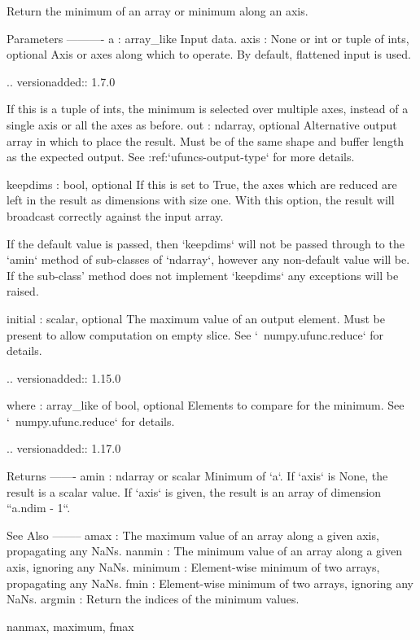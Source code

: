 \begin{DoxyVerb}Return the minimum of an array or minimum along an axis.

Parameters
----------
a : array_like
    Input data.
axis : None or int or tuple of ints, optional
    Axis or axes along which to operate.  By default, flattened input is
    used.

    .. versionadded:: 1.7.0

    If this is a tuple of ints, the minimum is selected over multiple axes,
    instead of a single axis or all the axes as before.
out : ndarray, optional
    Alternative output array in which to place the result.  Must
    be of the same shape and buffer length as the expected output.
    See :ref:`ufuncs-output-type` for more details.

keepdims : bool, optional
    If this is set to True, the axes which are reduced are left
    in the result as dimensions with size one. With this option,
    the result will broadcast correctly against the input array.

    If the default value is passed, then `keepdims` will not be
    passed through to the `amin` method of sub-classes of
    `ndarray`, however any non-default value will be.  If the
    sub-class' method does not implement `keepdims` any
    exceptions will be raised.

initial : scalar, optional
    The maximum value of an output element. Must be present to allow
    computation on empty slice. See `~numpy.ufunc.reduce` for details.

    .. versionadded:: 1.15.0

where : array_like of bool, optional
    Elements to compare for the minimum. See `~numpy.ufunc.reduce`
    for details.

    .. versionadded:: 1.17.0

Returns
-------
amin : ndarray or scalar
    Minimum of `a`. If `axis` is None, the result is a scalar value.
    If `axis` is given, the result is an array of dimension
    ``a.ndim - 1``.

See Also
--------
amax :
    The maximum value of an array along a given axis, propagating any NaNs.
nanmin :
    The minimum value of an array along a given axis, ignoring any NaNs.
minimum :
    Element-wise minimum of two arrays, propagating any NaNs.
fmin :
    Element-wise minimum of two arrays, ignoring any NaNs.
argmin :
    Return the indices of the minimum values.

nanmax, maximum, fmax


\end{DoxyVerb}
